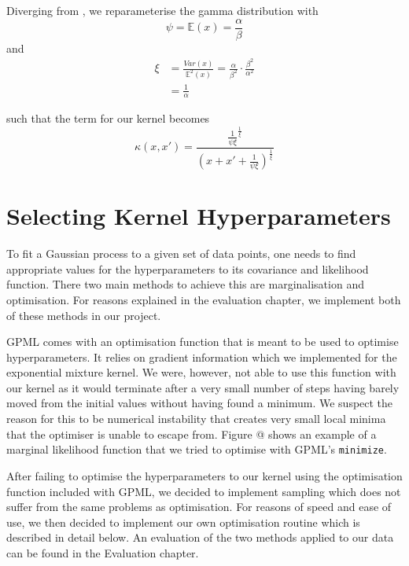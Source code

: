 \documentclass[a4paper,12pt,twoside,openright]{report}
\begin{document}
Diverging from \cite{2014arXiv1406.3896S}, we reparameterise the gamma distribution with
\begin{equation}
\psi = \mathbb{E}(x) = \frac{\alpha}{\beta}
\end{equation}
and
\begin{align}
\xi &= \frac{Var(x)}{\mathbb{E}^2 (x)} = \frac{\alpha}{\beta^2} \cdot \frac{\beta^2}{\alpha^2}\\
&= \frac{1}{\alpha}
\end{align}

such that the term for our kernel becomes
\begin{equation}
\kappa(x, x') = \frac{\frac{1}{\psi\xi}^{\frac{1}{\xi}}}{(x+x'+\frac{1}{\psi\xi})^{\frac{1}{\xi}}}
\end{equation}



\section{Selecting Kernel Hyperparameters} 

To fit a Gaussian process to a given set of data points, one needs to find appropriate values for the hyperparameters to its covariance and likelihood function. There two main methods to achieve this are marginalisation and optimisation. For reasons explained in the evaluation chapter, we implement both of these methods in our project.

GPML comes with an optimisation function that is meant to be used to optimise hyperparameters. It relies on gradient information which we implemented for the exponential mixture kernel. We were, however, not able to use this function with our kernel as it would terminate after a very small number of steps having barely moved from the initial values without having found a minimum. We suspect the reason for this to be numerical instability that creates very small local minima that the optimiser is unable to escape from. Figure @ shows an example of a marginal likelihood function that we tried to optimise with GPML's \texttt{minimize}.

After failing to optimise the hyperparameters to our kernel using the optimisation function included with GPML, we decided to implement sampling which does not suffer from the same problems as optimisation. For reasons of speed and ease of use, we then decided to implement our own optimisation routine which is described in detail below. An evaluation of the two methods applied to our data can be found in the Evaluation chapter.
\end{document}
